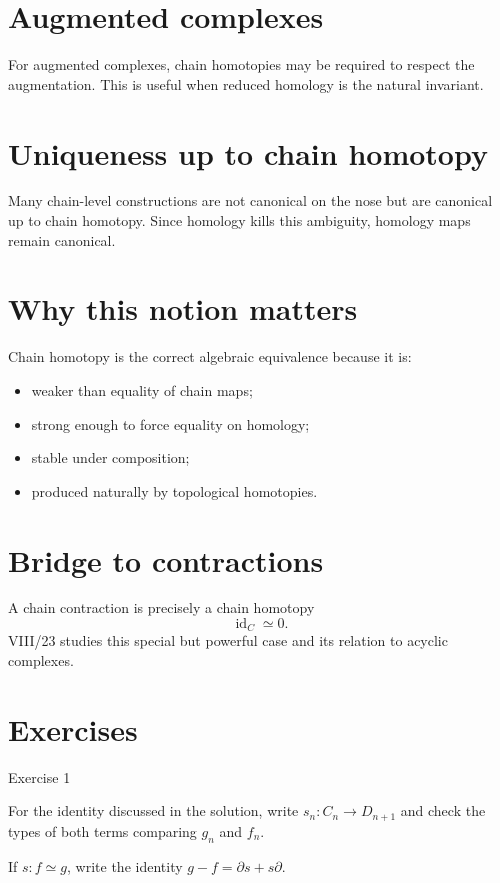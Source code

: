 \section{Augmented complexes}
For augmented complexes, chain homotopies may be required to respect the
augmentation.  This is useful when reduced homology is the natural invariant.

\section{Uniqueness up to chain homotopy}
Many chain-level constructions are not canonical on the nose but are canonical
up to chain homotopy.  Since homology kills this ambiguity, homology maps remain
canonical.

\section{Why this notion matters}
Chain homotopy is the correct algebraic equivalence because it is:
\begin{itemize}
\item weaker than equality of chain maps;
\item strong enough to force equality on homology;
\item stable under composition;
\item produced naturally by topological homotopies.
\end{itemize}

\section{Bridge to contractions}
A chain contraction is precisely a chain homotopy
\[
\operatorname{id}_C\simeq0.
\]
VIII/23 studies this special but powerful case and its relation to acyclic
complexes.


\section{Exercises}

\begin{exercise}\label{exr:viii22-01}
Exercise 1
\end{exercise}
\begin{hint}
For the identity discussed in the solution, write \(s_n:C_n\to D_{n+1}\) and check the types of both terms comparing \(g_n\) and \(f_n\).
\end{hint}
\begin{solution}
If \(s:f\simeq g\), write the identity \(g-f=\partial s+s\partial\).
\end{solution}

